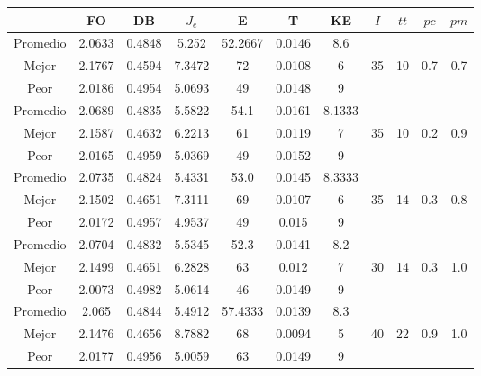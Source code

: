 \begin{table}[h!]
    \footnotesize
    \begin{center}
        \begin{tabular}{|c|c|c|c|c|c|c|c|c|c|c|}
        \hline
             & {\bf FO} & {\bf DB} & $J_e$ & {\bf E} & {\bf T} & {\bf KE} & $I$ & $tt$ & $pc$ & $pm$ \\
        \hline
        \hline
            Promedio  & 2.0633 & 0.4848 & 5.252 & 52.2667 & 0.0146 & 8.6 &  &  &  & \\
            \cline{1-7}
            Mejor & 2.1767 & 0.4594  & 7.3472 & 72 & 0.0108 & 6 & 35 & 10 & 0.7 & 0.7\\
            \cline{1-7}
            Peor & 2.0186 & 0.4954  & 5.0693 & 49 & 0.0148 & 9 &  &  &  & \\
        \hline
        \hline
            Promedio  & 2.0689 & 0.4835 & 5.5822 & 54.1 & 0.0161 & 8.1333 &  &  &  & \\
            \cline{1-7}
            Mejor & 2.1587 & 0.4632  & 6.2213 & 61 & 0.0119 & 7 & 35 & 10 & 0.2 & 0.9\\
            \cline{1-7}
            Peor & 2.0165 & 0.4959  & 5.0369 & 49 & 0.0152 & 9 &  &  &  & \\
        \hline
        \hline
            Promedio  & 2.0735 & 0.4824 & 5.4331 & 53.0 & 0.0145 & 8.3333 &  &  &  & \\
            \cline{1-7}
            Mejor & 2.1502 & 0.4651  & 7.3111 & 69 & 0.0107 & 6 & 35 & 14 & 0.3 & 0.8\\
            \cline{1-7}
            Peor & 2.0172 & 0.4957  & 4.9537 & 49 & 0.015 & 9 &  &  &  & \\
        \hline
        \hline
            Promedio  & 2.0704 & 0.4832 & 5.5345 & 52.3 & 0.0141 & 8.2 &  &  &  & \\
            \cline{1-7}
            Mejor & 2.1499 & 0.4651  & 6.2828 & 63 & 0.012 & 7 & 30 & 14 & 0.3 & 1.0\\
            \cline{1-7}
            Peor & 2.0073 & 0.4982  & 5.0614 & 46 & 0.0149 & 9 &  &  &  & \\
        \hline
        \hline
            Promedio  & 2.065 & 0.4844 & 5.4912 & 57.4333 & 0.0139 & 8.3 &  &  &  & \\
            \cline{1-7}
            Mejor & 2.1476 & 0.4656  & 8.7882 & 68 & 0.0094 & 5 & 40 & 22 & 0.9 & 1.0\\
            \cline{1-7}
            Peor & 2.0177 & 0.4956  & 5.0059 & 63 & 0.0149 & 9 &  &  &  & \\

\end{tabular}
\end{center}
\end{table}

